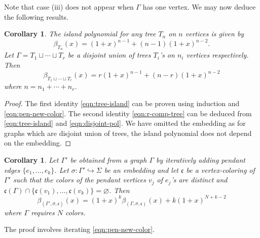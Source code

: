 \documentclass[10pt, reqno]{amsart}
\theoremstyle{plain}
\newtheorem{cor}[theorem]{Corollary}
\theoremstyle{remark}
\theoremstyle{definition}
\numberwithin{equation}{section}
\begin{document}
Note that case (iii) does not appear when $\Gamma$ has one vertex. We may now deduce the following results.
\begin{cor}\label{cor:tree-island}
The island polynomial for any tree $T_n$ on $n$ vertices is given by
\begin{equation}\label{eqn:tree-island}
\beta_{T_n}(x)=(1+x)^{n-1}+(n-1)(1+x)^{n-2}.
\end{equation}
Let $\Gamma=T_1\sqcup\cdots\sqcup T_r$ be a disjoint union of trees $T_i$'s on $n_i$ vertices respectively. Then 
\begin{equation}\label{eqn:r-comp-tree}
\beta_{T_1\sqcup\cdots\sqcup T_r}(x)=r(1+x)^{n-1}+(n-r)(1+x)^{n-2} 
\end{equation}
where $n=n_1+\cdots+n_r$.
\end{cor}
\begin{proof}
The first identity \eqref{eqn:tree-island} can be proven using induction and \eqref{eqn:pen-new-color}. The second identity \eqref{eqn:r-comp-tree} can be deduced from \eqref{eqn:tree-island} and \eqref{eqn:disjoint-pol}. We have omitted the embedding as for graphs which are disjoint union of trees, the island polynomial does not depend on the embedding.
\end{proof}
\begin{cor}\label{cor:it-pendant}
Let $\Gamma'$ be obtained from a graph $\Gamma$ by iteratively adding pendant edges $\{e_1,\ldots,e_k\}$. Let $\sigma:\Gamma'\hookrightarrow \Sigma$ be an embedding and let $\mathfrak{c}$ be a vertex-coloring of $\Gamma'$ such that the colors of the pendant vertices $v_j$ of $e_j$'s are distinct and $\mathfrak{c}(\Gamma)\cap \{\mathfrak{c}(v_1),\ldots,\mathfrak{c}(v_k)\}=\varnothing$. Then 
\begin{equation}\label{eqn:it-pendant}
    \beta_{(\Gamma',\sigma,\mathfrak{c})}(x)=(1+x)^k \beta_{(\Gamma,\sigma,\mathfrak{c})}(x)+k(1+x)^{N+k-2}
\end{equation}
where $\Gamma$ requires $N$ colors. 
\end{cor}
The proof involves iterating \eqref{eqn:pen-new-color}. 
\end{document}

